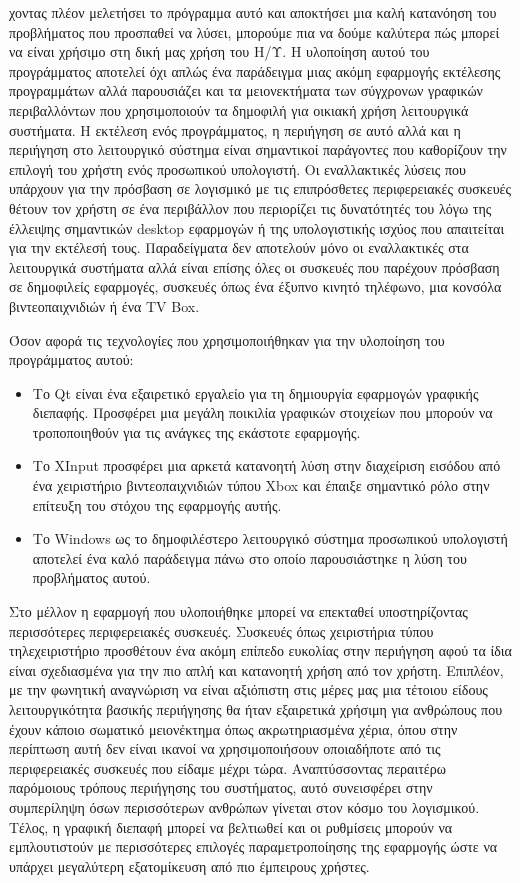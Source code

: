 χοντας πλέον μελετήσει το πρόγραμμα αυτό και αποκτήσει μια καλή κατανόηση του
προβλήματος που προσπαθεί να λύσει, μπορούμε πια να δούμε καλύτερα πώς μπορεί
να είναι χρήσιμο στη δική μας χρήση του Η/Υ. Η υλοποίηση αυτού του προγράμματος
αποτελεί όχι απλώς ένα παράδειγμα μιας ακόμη εφαρμογής εκτέλεσης προγραμμάτων αλλά
παρουσιάζει και τα μειονεκτήματα των σύγχρονων γραφικών περιβαλλόντων που χρησιμοποιούν
τα δημοφιλή για οικιακή χρήση λειτουργικά συστήματα. Η εκτέλεση ενός προγράμματος, η περιήγηση
σε αυτό αλλά και η περιήγηση στο λειτουργικό σύστημα είναι σημαντικοί παράγοντες
που καθορίζουν την επιλογή του χρήστη ενός προσωπικού υπολογιστή. Οι εναλλακτικές λύσεις που
υπάρχουν για την πρόσβαση σε λογισμικό με τις επιπρόσθετες περιφερειακές συσκευές
θέτουν τον χρήστη σε ένα περιβάλλον που περιορίζει τις δυνατότητές του λόγω της έλλειψης
σημαντικών desktop εφαρμογών ή της υπολογιστικής ισχύος που απαιτείται για την εκτέλεσή τους.
Παραδείγματα δεν αποτελούν μόνο οι εναλλακτικές στα λειτουργικά συστήματα αλλά είναι επίσης
όλες οι συσκευές που παρέχουν πρόσβαση σε δημοφιλείς εφαρμογές, συσκευές όπως ένα έξυπνο κινητό
τηλέφωνο, μια κονσόλα βιντεοπαιχνιδιών ή ένα TV Box.

Όσον αφορά τις τεχνολογίες που χρησιμοποιήθηκαν για την υλοποίηση του προγράμματος αυτού:
\begin{itemize}
	\item
Το Qt είναι ένα εξαιρετικό εργαλείο για τη δημιουργία εφαρμογών γραφικής διεπαφής. Προσφέρει
μια μεγάλη ποικιλία γραφικών στοιχείων που μπορούν να τροποποιηθούν για τις ανάγκες της εκάστοτε
εφαρμογής.
	\item
Το XInput προσφέρει μια αρκετά κατανοητή λύση στην διαχείριση εισόδου από ένα χειριστήριο βιντεοπαιχνιδιών
τύπου Xbox και έπαιξε σημαντικό ρόλο στην επίτευξη του στόχου της εφαρμογής αυτής.
	\item
Το Windows ως το δημοφιλέστερο λειτουργικό σύστημα προσωπικού υπολογιστή αποτελεί ένα καλό παράδειγμα πάνω
στο οποίο παρουσιάστηκε η λύση του προβλήματος αυτού.
\end{itemize} 

 
Στο μέλλον η εφαρμογή που υλοποιήθηκε μπορεί να επεκταθεί υποστηρίζοντας περισσότερες περιφερειακές
συσκευές. Συσκευές όπως χειριστήρια τύπου τηλεχειριστήριο προσθέτουν ένα ακόμη επίπεδο ευκολίας στην
περιήγηση αφού τα ίδια είναι σχεδιασμένα για την πιο απλή και κατανοητή χρήση από τον χρήστη. Επιπλέον,
με την φωνητική αναγνώριση να είναι αξιόπιστη στις μέρες μας μια τέτοιου είδους λειτουργικότητα βασικής
περιήγησης θα ήταν εξαιρετικά χρήσιμη για ανθρώπους που έχουν κάποιο σωματικό μειονέκτημα όπως ακρωτηριασμένα
χέρια, όπου στην περίπτωση αυτή δεν είναι ικανοί να χρησιμοποιήσουν οποιαδήποτε από τις περιφερειακές συσκευές
που είδαμε μέχρι τώρα. Αναπτύσσοντας περαιτέρω παρόμοιους τρόπους περιήγησης του συστήματος, αυτό συνεισφέρει στην
συμπερίληψη όσων περισσότερων ανθρώπων γίνεται στον κόσμο του λογισμικού. Τέλος, η γραφική διεπαφή μπορεί
να βελτιωθεί και οι ρυθμίσεις μπορούν να εμπλουτιστούν με περισσότερες επιλογές παραμετροποίησης της εφαρμογής
ώστε να υπάρχει μεγαλύτερη εξατομίκευση από πιο έμπειρους χρήστες.